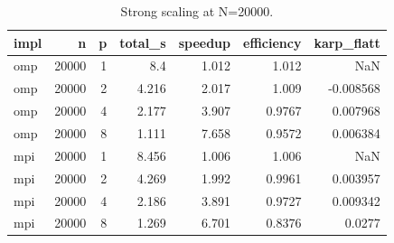 \begin{table}
\caption{Strong scaling at N=20000.}
\label{tab:scaling}
\begin{tabular}{lrrrrrr}
\toprule
impl & n & p & total\_s & speedup & efficiency & karp\_flatt \\
\midrule
omp & 20000 & 1 & 8.4 & 1.012 & 1.012 & NaN \\
omp & 20000 & 2 & 4.216 & 2.017 & 1.009 & -0.008568 \\
omp & 20000 & 4 & 2.177 & 3.907 & 0.9767 & 0.007968 \\
omp & 20000 & 8 & 1.111 & 7.658 & 0.9572 & 0.006384 \\
mpi & 20000 & 1 & 8.456 & 1.006 & 1.006 & NaN \\
mpi & 20000 & 2 & 4.269 & 1.992 & 0.9961 & 0.003957 \\
mpi & 20000 & 4 & 2.186 & 3.891 & 0.9727 & 0.009342 \\
mpi & 20000 & 8 & 1.269 & 6.701 & 0.8376 & 0.0277 \\
\bottomrule
\end{tabular}
\end{table}
